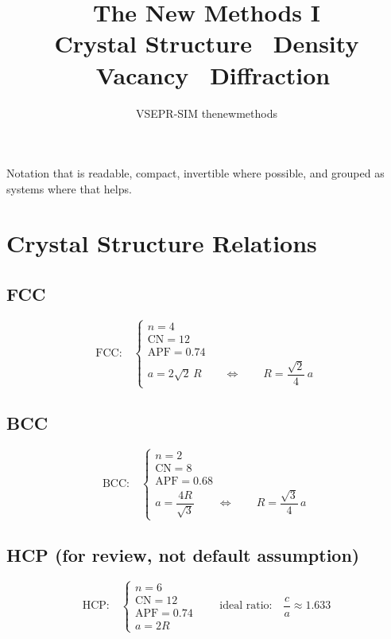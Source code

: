 \documentclass[11pt, letterpaper]{article}
\title{\textbf{The New Methods I}\\[0.4em]
\large Crystal Structure \textbullet\ Density \textbullet\
Vacancy \textbullet\ Diffraction}
\author{VSEPR-SIM thenewmethods}
\date{}
\begin{document}
\maketitle
\thispagestyle{empty}

\noindent
Notation that is readable, compact, invertible where possible, and grouped
as systems where that helps.

\section{Crystal Structure Relations}

\subsection{FCC}

\[
\text{FCC:}\quad
\begin{cases}
  n = 4 \\[2pt]
  \mathrm{CN} = 12 \\[2pt]
  \mathrm{APF} = 0.74 \\[2pt]
  a = 2\sqrt{2}\,R \qquad \Longleftrightarrow \qquad R = \dfrac{\sqrt{2}}{4}\,a
\end{cases}
\]

\subsection{BCC}

\[
\text{BCC:}\quad
\begin{cases}
  n = 2 \\[2pt]
  \mathrm{CN} = 8 \\[2pt]
  \mathrm{APF} = 0.68 \\[2pt]
  a = \dfrac{4R}{\sqrt{3}} \qquad \Longleftrightarrow \qquad R = \dfrac{\sqrt{3}}{4}\,a
\end{cases}
\]

\subsection{HCP (for review, not default assumption)}

\[
\text{HCP:}\quad
\begin{cases}
  n = 6 \\[2pt]
  \mathrm{CN} = 12 \\[2pt]
  \mathrm{APF} = 0.74 \\[2pt]
  a = 2R
\end{cases}
\qquad \text{ideal ratio:}\quad \frac{c}{a} \approx 1.633
\]
\end{document}
